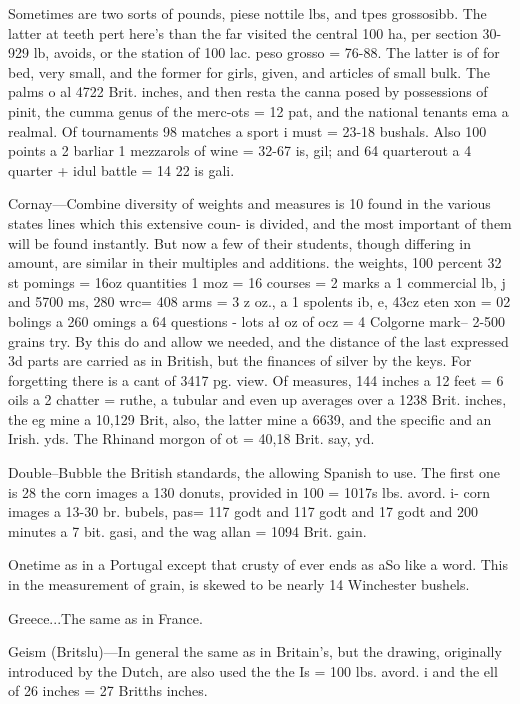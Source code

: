 \documentclass{article}
\begin{document}
Sometimes are two sorts of pounds, piese nottile lbs, and tpes grossosibb. The latter at teeth pert here's than the far visited the central 100 ha, per section 30-929 lb, avoids, or the station of 100 lac. peso grosso = 76-88. The latter is of for bed, very small, and the former for girls, given, and articles of small bulk. The palms o al 4722 Brit. inches, and then resta the canna posed by possessions of pinit, the cumma genus of the merc-ots = 12 pat, and the national tenants ema a realmal. Of tournaments 98 matches a sport i must = 23-18 bushals. Also 100 points a 2 barliar 1 mezzarols of wine = 32-67 is, gil; and 64 quarterout a 4 quarter + idul battle = 14 22 is gali.

Cornay—Combine diversity of weights and measures is 10 found in the various states lines which this extensive coun- is divided, and the most important of them will be found instantly. But now a few of their students, though differing in amount, are similar in their multiples and additions. the weights, 100 percent 32 st pomings = 16oz quantities 1 moz = 16 courses = 2 marks a 1 commercial lb, j and 5700 ms, 280 wrc= 408 arms = 3 z oz., a 1 spolents ib, e, 43cz eten xon = 02 bolings a 260 omings a 64 questions - lots ał oz of ocz = 4 Colgorne mark– 2-500 grains try. By this do and allow we needed, and the distance of the last expressed 3d parts are carried as in British, but the finances of silver by the keys. For forgetting there is a cant of 3417 pg. view. Of measures, 144 inches a 12 feet = 6 oils a 2 chatter = ruthe, a tubular and even up averages over a 1238 Brit. inches, the eg mine a 10,129 Brit, also, the latter mine a 6639, and the specific and an Irish. yds. The Rhinand morgon of ot = 40,18 Brit. say, yd.

Double--Bubble the British standards, the allowing Spanish to use. The first one is 28 the corn images a 130 donuts, provided in 100 = 1017s lbs. avord. i- corn images a 13-30 br. bubels, pas= 117 godt and 117 godt and 17 godt and 200 minutes a 7 bit. gasi, and the wag allan = 1094 Brit. gain.

Onetime as in a Portugal except that crusty of ever ends as aSo like a word. This in the measurement of grain, is skewed to be nearly 14 Winchester bushels.

Greece...The same as in France.

Geism (Britslu)—In general the same as in Britain’s, but the drawing, originally introduced by the Dutch, are also used the the Is = 100 lbs. avord. i and the ell of 26 inches = 27 Britths inches.
\end{document}
